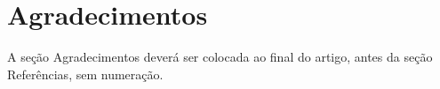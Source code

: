 \documentclass{RBCA}
\begin{document}
\section*{Agradecimentos}
A seção Agradecimentos deverá ser colocada ao final do artigo, antes da seção Referências, sem numeração.

\makeatletter
\renewcommand\@biblabel[1]{{\parbox{0.8cm}{[#1]}}}
\makeatother

\end{document}
